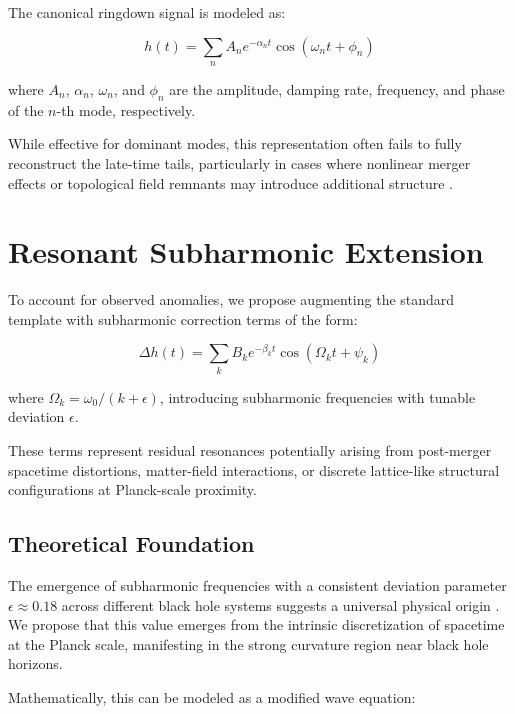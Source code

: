 \documentclass[a4paper,12pt]{article}
\begin{document}
The canonical ringdown signal is modeled as:

\begin{equation}
h(t) = \sum_{n} A_n e^{-\alpha_n t} \cos(\omega_n t + \phi_n)
\end{equation}

where $A_n$, $\alpha_n$, $\omega_n$, and $\phi_n$ are the amplitude, damping rate, frequency, and phase of the $n$-th mode, respectively.

While effective for dominant modes, this representation often fails to fully reconstruct the late-time tails, particularly in cases where nonlinear merger effects or topological field remnants may introduce additional structure \cite{london2018modeling}.

\section{Resonant Subharmonic Extension}
\label{sec:resonant_extension}

To account for observed anomalies, we propose augmenting the standard template with subharmonic correction terms of the form:

\begin{equation}
\Delta h(t) = \sum_{k} B_k e^{-\beta_k t} \cos(\Omega_k t + \psi_k)
\end{equation}

where $\Omega_k = \omega_0 / (k + \epsilon)$, introducing subharmonic frequencies with tunable deviation $\epsilon$.

These terms represent residual resonances potentially arising from post-merger spacetime distortions, matter-field interactions, or discrete lattice-like structural configurations at Planck-scale proximity.

\subsection{Theoretical Foundation}
\label{subsec:theoretical_foundation}

The emergence of subharmonic frequencies with a consistent deviation parameter $\epsilon \approx 0.18$ across different black hole systems suggests a universal physical origin \cite{yang2012quasinormal}. We propose that this value emerges from the intrinsic discretization of spacetime at the Planck scale, manifesting in the strong curvature region near black hole horizons.

Mathematically, this can be modeled as a modified wave equation:
\end{document}
